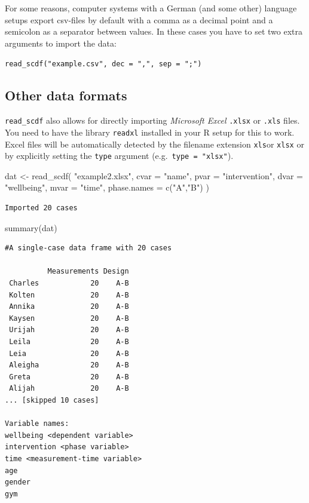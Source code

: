 \documentclass[
  letterpaper,
  DIV=11,
  numbers=noendperiod]{scrreprt}
\newenvironment{Shaded}{\begin{snugshade}}{\end{snugshade}}
\newcommand{\AttributeTok}[1]{\textcolor[rgb]{0.40,0.45,0.13}{#1}}
\newcommand{\FunctionTok}[1]{\textcolor[rgb]{0.28,0.35,0.67}{#1}}
\newcommand{\NormalTok}[1]{\textcolor[rgb]{0.00,0.23,0.31}{#1}}
\newcommand{\OtherTok}[1]{\textcolor[rgb]{0.00,0.23,0.31}{#1}}
\newcommand{\StringTok}[1]{\textcolor[rgb]{0.13,0.47,0.30}{#1}}
\begin{document}
For some reasons, computer systems with a German (and some other)
language setups export csv-files by default with a comma as a decimal
point and a semicolon as a separator between values. In these cases you
have to set two extra arguments to import the data:

\texttt{read\_scdf("example.csv",\ dec\ =\ ",",\ sep\ =\ ";")}

\hypertarget{other-data-formats}{%
\subsection{Other data formats}\label{other-data-formats}}

\texttt{read\_scdf} also allows for directly importing \emph{Microsoft
Excel} \texttt{.xlsx} or \texttt{.xls} files. You need to have the
library \texttt{readxl} installed in your R setup for this to work.
Excel files will be automatically detected by the filename extension
\texttt{xls}or \texttt{xlsx} or by explicitly setting the \texttt{type}
argument (e.g.~\texttt{type\ =\ "xlsx"}).

\begin{Shaded}
\begin{Highlighting}[]
\NormalTok{dat }\OtherTok{\textless{}{-}} \FunctionTok{read\_scdf}\NormalTok{(}
  \StringTok{"example2.xlsx"}\NormalTok{, }\AttributeTok{cvar =} \StringTok{"name"}\NormalTok{, }\AttributeTok{pvar =} \StringTok{"intervention"}\NormalTok{, }
  \AttributeTok{dvar =} \StringTok{"wellbeing"}\NormalTok{, }\AttributeTok{mvar =} \StringTok{"time"}\NormalTok{, }\AttributeTok{phase.names =} \FunctionTok{c}\NormalTok{(}\StringTok{"A"}\NormalTok{,}\StringTok{"B"}\NormalTok{)}
\NormalTok{)}
\end{Highlighting}
\end{Shaded}

\begin{verbatim}
Imported 20 cases
\end{verbatim}

\begin{Shaded}
\begin{Highlighting}[]
\FunctionTok{summary}\NormalTok{(dat)}
\end{Highlighting}
\end{Shaded}

\begin{verbatim}
#A single-case data frame with 20 cases

          Measurements Design
 Charles            20    A-B
 Kolten             20    A-B
 Annika             20    A-B
 Kaysen             20    A-B
 Urijah             20    A-B
 Leila              20    A-B
 Leia               20    A-B
 Aleigha            20    A-B
 Greta              20    A-B
 Alijah             20    A-B
... [skipped 10 cases]

Variable names:
wellbeing <dependent variable>
intervention <phase variable>
time <measurement-time variable>
age
gender
gym
\end{verbatim}
\end{document}
